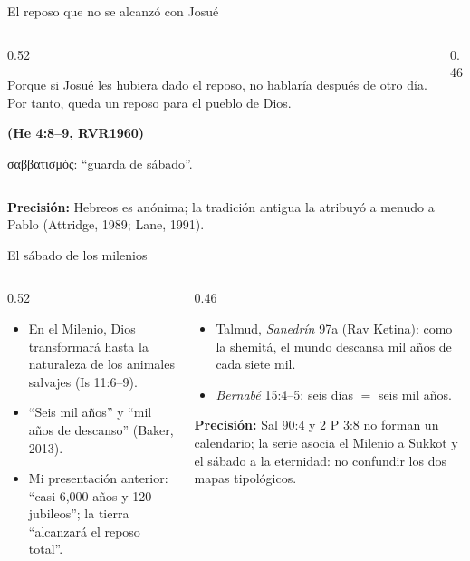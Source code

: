 \documentclass[hyperref={bookmarks=false},aspectratio=169]{beamer}
\newcommand{\grc}[1]{\foreignlanguage{ancientgreek}{#1}}
\newcommand{\fuente}[1]{\par\hfill{\upshape\bfseries\footnotesize\textcolor{tierraroja}{#1}}}
\newcommand{\precision}[1]{{\footnotesize\color{sepia}\textbf{Precisión:} #1}}
\begin{document}
\begin{frame}{El reposo que no se alcanzó con Josué}
\begin{columns}[c,onlytextwidth]
\begin{column}{0.52\textwidth}
\begin{cita}Porque si Josué les hubiera dado el reposo, no hablaría después de otro día. Por tanto, queda un reposo para el pueblo de Dios.\fuente{(He 4:8--9, RVR1960)}\end{cita}
\scriptsize \grc{σαββατισμός}: ``guarda de sábado''.
\end{column}
\begin{column}{0.46\textwidth}
\centering
{}
\end{column}
\end{columns}\medskip
\precision{Hebreos es anónima; la tradición antigua la atribuyó a menudo a Pablo (Attridge, 1989; Lane, 1991).}
\end{frame}

\begin{frame}{El sábado de los milenios}
\begin{columns}[t,onlytextwidth]
\begin{column}{0.52\textwidth}\small
\begin{itemize}
\item En el Milenio, Dios transformará hasta la naturaleza de los animales salvajes (Is 11:6--9).
\item ``Seis mil años'' y ``mil años de descanso'' (Baker, 2013).
\item Mi presentación anterior: ``casi 6,000 años y 120 jubileos''; la tierra ``alcanzará el reposo total''.
\end{itemize}
\end{column}
\begin{column}{0.46\textwidth}\small
\begin{itemize}
\item Talmud, \emph{Sanedrín} 97a (Rav Ketina): como la shemitá, el mundo descansa mil años de cada siete mil.
\item \emph{Bernabé} 15:4--5: seis días $=$ seis mil años.
\end{itemize}
\precision{Sal 90:4 y 2 P 3:8 no forman un calendario; la serie asocia el Milenio a Sukkot y el sábado a la eternidad: no confundir los dos mapas tipológicos.}
\end{column}
\end{columns}
\end{frame}
\end{document}
